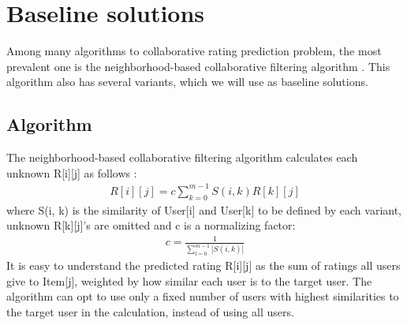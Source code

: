 \documentclass[letterpaper]{article}
\begin{document}
\section{Baseline solutions}
Among many algorithms to collaborative rating prediction problem,
the most prevalent one is the neighborhood-based collaborative filtering 
algorithm \cite{su2009survey}.
This algorithm also has several variants,
which we will use as baseline solutions.

\subsection{Algorithm}
The neighborhood-based collaborative filtering algorithm calculates each 
unknown R[i][j] as 
follows \cite{su2009survey}:
\begin{align*}
R[i][j] = c \sum_{k = 0}^{m-1} S(i, k) R[k][j]
\end{align*}
where S(i, k) is the similarity of User[i] and User[k] to be defined by each 
variant,
unknown R[k][j]'s are omitted and c is a normalizing factor:
\begin{align*}
	c = \frac{1}{\sum_{l = 0}^{m - 1} |S(i, k)|}
\end{align*}
It is easy to understand the predicted rating R[i][j] as the sum of ratings all 
users give to Item[j],
weighted by how similar each user is to the target user.
The algorithm can opt to use only a fixed number of users with highest 
similarities to the target user in the calculation, instead of using all users.
\end{document}
